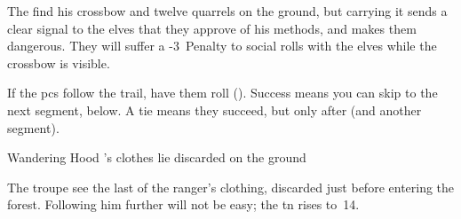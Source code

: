 The find his \gls{crossbow} and twelve quarrels on the ground, but carrying it sends a clear signal to the elves that they approve of his methods, and makes them dangerous.
They will suffer a -3~Penalty to social rolls with the elves while the \gls{crossbow} is visible.

If the \glspl{pc} follow the trail, have them roll  (\tn[10]).
Success means you can skip to the next \gls{segment}, below.
A tie means they succeed, but only after  (and another \gls{segment}).

{Wandering Hood}%
{'s clothes lie discarded on the ground}%

The troupe see the last of the ranger's clothing, discarded just before entering the forest.
Following him further will not be easy; the \gls{tn} rises to~14.

